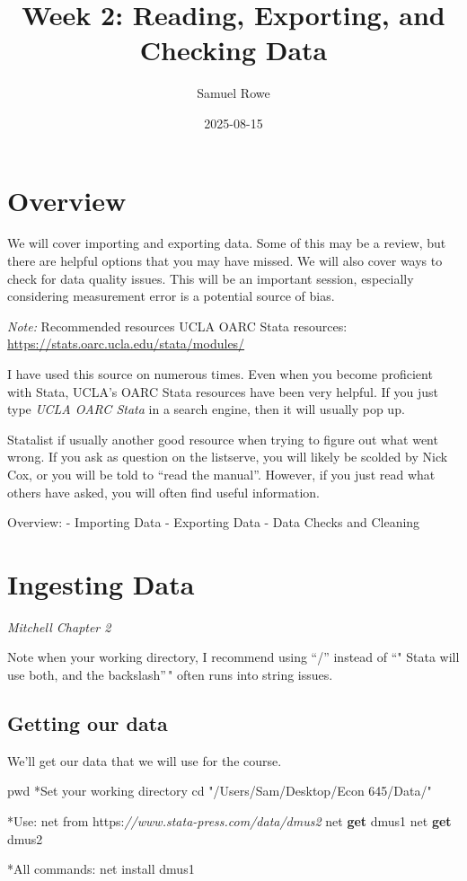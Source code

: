 \documentclass[
]{book}
\title{Week 2: Reading, Exporting, and Checking Data}
\author{Samuel Rowe}
\date{2025-08-15}
\newenvironment{Shaded}{\begin{snugshade}}{\end{snugshade}}
\newcommand{\CommentTok}[1]{\textcolor[rgb]{0.56,0.35,0.01}{\textit{#1}}}
\newcommand{\FunctionTok}[1]{\textcolor[rgb]{0.13,0.29,0.53}{\textbf{#1}}}
\newcommand{\NormalTok}[1]{#1}
\newcommand{\StringTok}[1]{\textcolor[rgb]{0.31,0.60,0.02}{#1}}
\begin{document}
\maketitle

{
\setcounter{tocdepth}{1}
\tableofcontents
}
\chapter{Overview}\label{overview}

We will cover importing and exporting data. Some of this may be a review, but there are helpful options that you may have missed. We will also cover ways to check for data quality issues. This will be an important session, especially considering measurement error is a potential source of bias.

\emph{Note: }Recommended resources
UCLA OARC Stata resources: \url{https://stats.oarc.ucla.edu/stata/modules/}

I have used this source on numerous times. Even when you become proficient with Stata, UCLA's OARC Stata resources have been very helpful. If you just type \emph{UCLA OARC Stata } in a search engine, then it will usually pop up.

Statalist if usually another good resource when trying to figure out what went wrong. If you ask as question on the listserve, you will likely be scolded by Nick Cox, or you will be told to ``read the manual''. However, if you just read what others have asked, you will often find useful information.

Overview:
- Importing Data
- Exporting Data
- Data Checks and Cleaning

\chapter{Ingesting Data}\label{ingesting-data}

\emph{Mitchell Chapter 2}

Note when your working directory, I recommend using ``/'' instead of ``"
Stata will use both, and the backslash''\," often runs into string issues.

\section{Getting our data}\label{getting-our-data}

We'll get our data that we will use for the course.

\begin{Shaded}
\begin{Highlighting}[]
\NormalTok{pwd}
\NormalTok{*Set your working directory}
\NormalTok{cd }\StringTok{"/Users/Sam/Desktop/Econ 645/Data/"}

\NormalTok{*Use:}
\NormalTok{net from https:}\CommentTok{//www.stata{-}press.com/data/dmus2}
\NormalTok{net }\FunctionTok{get}\NormalTok{ dmus1}
\NormalTok{net }\FunctionTok{get}\NormalTok{ dmus2}

\NormalTok{*All commands:}
\NormalTok{net install dmus1}
\end{Highlighting}
\end{Shaded}
\end{document}
